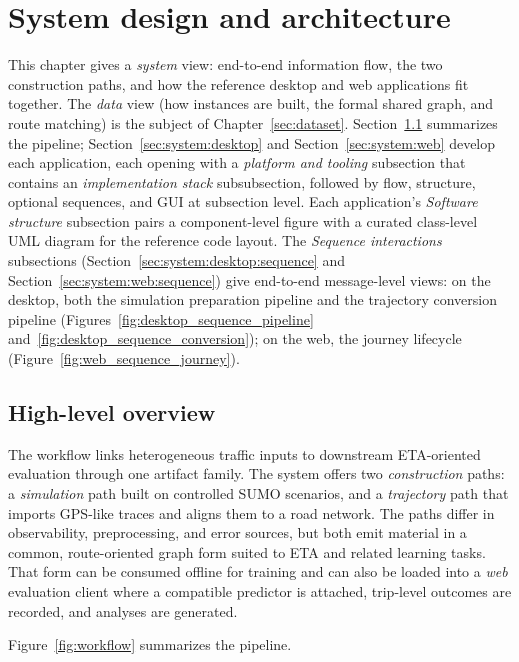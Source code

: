 \chapter{System design and architecture}\label{sec:system}

This chapter gives a \emph{system} view: end-to-end information flow, the two construction paths, and how the reference desktop and web applications fit together. The \emph{data} view (how instances are built, the formal shared graph, and route matching) is the subject of Chapter~\ref{sec:dataset}. Section~\ref{sec:system:overview} summarizes the pipeline; Section~\ref{sec:system:desktop} and Section~\ref{sec:system:web} develop each application, each opening with a \emph{platform and tooling} subsection that contains an \emph{implementation stack} subsubsection, followed by flow, structure, optional sequences, and GUI at subsection level. Each application's \emph{Software structure} subsection pairs a component-level figure with a curated class-level UML diagram for the reference code layout. The \emph{Sequence interactions} subsections (Section~\ref{sec:system:desktop:sequence} and Section~\ref{sec:system:web:sequence}) give end-to-end message-level views: on the desktop, both the simulation preparation pipeline and the trajectory conversion pipeline (Figures~\ref{fig:desktop_sequence_pipeline} and~\ref{fig:desktop_sequence_conversion}); on the web, the journey lifecycle (Figure~\ref{fig:web_sequence_journey}).

\section{High-level overview}\label{sec:system:overview}
The workflow links heterogeneous traffic inputs to downstream ETA-oriented evaluation through one artifact family. The system offers two \emph{construction} paths: a \emph{simulation} path built on controlled SUMO scenarios, and a \emph{trajectory} path that imports GPS-like traces and aligns them to a road network. The paths differ in observability, preprocessing, and error sources, but both emit material in a common, route-oriented graph form suited to ETA and related learning tasks. That form can be consumed offline for training and can also be loaded into a \emph{web} evaluation client where a compatible predictor is attached, trip-level outcomes are recorded, and analyses are generated.

Figure~\ref{fig:workflow} summarizes the pipeline.

